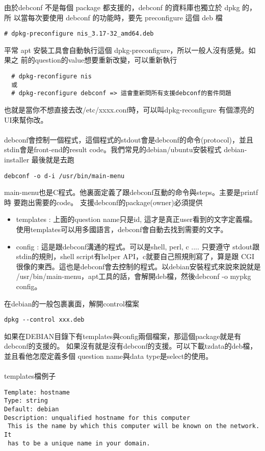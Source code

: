   由於debconf 不是每個 package 都支援的，debconf 的資料庫也獨立於 dpkg 的，所
  以當每次要使用 debconf 的功能時，要先 preconfigure 這個 deb 檔
  \begin{verbatim}
# dpkg-preconfigure nis_3.17-32_amd64.deb
  \end{verbatim}
  平常 apt 安裝工具會自動執行這個 dpkg-preconfigure，所以一般人沒有感覺。如果之
  前的question的value想要重新改變，可以重新執行
  \begin{verbatim}
  # dpkg-reconfigure nis
  或
  # dpkg-reconfigure debconf => 這會重新問所有支援debconf的套件問題
  \end{verbatim}
  也就是當你不想直接去改/etc/xxxx.conf時，可以叫dpkg-reconfigure 有個漂亮的
  UI來幫你改。
  \\\\
  debconf會控制一個程式，這個程式的stdout會是debconf的命令(protocol)，並且
  stdin會是front-end的result code。我們常見的debian/ubuntu安裝程式
  debian-installer 最後就是去跑
  \begin{verbatim}
debconf -o d-i /usr/bin/main-menu
  \end{verbatim}
  main-menu也是C程式。他裏面定義了跟debconf互動的命令與steps。主要是printf時
  要跑出需要的code。
  支援debconf的package(owner)必須提供
  \begin{itemize}
    \item templates : 上面的question name只是id, 這才是真正user看到的文字定義檔。
      使用templates可以用多國語言，debconf會自動去找到需要的文字。
    \item config    : 這是跟debconf溝通的程式。可以是shell, perl, c .... 只要遵守
      stdout跟stdin的規則，shell script有helper API，c就要自己照規則寫了，算是跟
      CGI很像的東西。這也是debconf會去控制的程式。以debian安裝程式來說來說就是
      /usr/bin/main-menu，apt工具的話，會解開deb檔，然後debconf -o mypkg config。
  \end{itemize}
  在debian的一般包裹裏面，解開control檔案
  \begin{verbatim}
dpkg --control xxx.deb
  \end{verbatim}
  如果在DEBIAN目錄下有templates與config兩個檔案，那這個package就是有debconf的支援的。
  如果沒有就是沒有debconf的支援。可以下載tzdata的deb檔，並且看他怎麼定義多個
  question name與data type是select的使用。
  \\\\
  templates檔例子
  \begin{verbatim}
Template: hostname
Type: string
Default: debian
Description: unqualified hostname for this computer
 This is the name by which this computer will be known on the network. It
 has to be a unique name in your domain.
  \end{verbatim}
